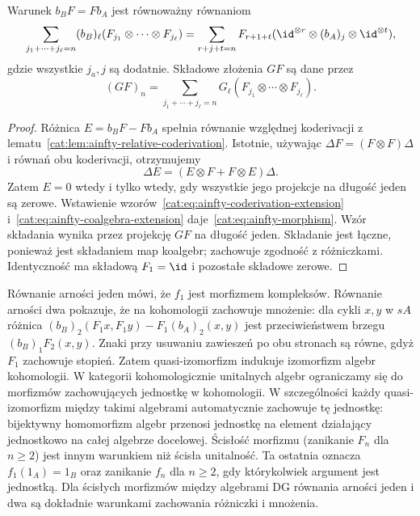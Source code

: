 \begin{stwierdzenie}\label{cat:prop:ainfty-morphism-equations}
Warunek $b_B F=F b_A$ jest równoważny równaniom
\begin{equation}\label{cat:eq:ainfty-morphism}
 \sum_{j_1+\cdots+j_\ell=n}
 (b_B)_\ell(F_{j_1}\otimes\cdots\otimes F_{j_\ell})
 =
 \sum_{r+j+t=n}F_{r+1+t}
 (\id^{\otimes r}\otimes(b_A)_j\otimes\id^{\otimes t}),
\end{equation}
gdzie wszystkie $j_a,j$ są dodatnie. Składowe złożenia $GF$ są dane przez
\[
 (GF)_n=\sum_{j_1+\cdots+j_\ell=n}
 G_\ell(F_{j_1}\otimes\cdots\otimes F_{j_\ell}).
\]
\end{stwierdzenie}
\begin{proof}
Różnica $E=b_B F-Fb_A$ spełnia równanie względnej koderivacji z lematu~\ref{cat:lem:ainfty-relative-coderivation}. Istotnie, używając $\Delta F=(F\otimes F)\Delta$ i równań obu koderivacji, otrzymujemy
\[
 \Delta E=(E\otimes F+F\otimes E)\Delta.
\]
Zatem $E=0$ wtedy i tylko wtedy, gdy wszystkie jego projekcje na długość jeden są zerowe. Wstawienie wzorów~\eqref{cat:eq:ainfty-coderivation-extension} i~\eqref{cat:eq:ainfty-coalgebra-extension} daje~\eqref{cat:eq:ainfty-morphism}. Wzór składania wynika przez projekcję $GF$ na długość jeden. Składanie jest łączne, ponieważ jest składaniem map koalgebr; zachowuje zgodność z różniczkami. Identyczność ma składową $F_1=\id$ i pozostałe składowe zerowe.
\end{proof}

Równanie arności jeden mówi, że $f_1$ jest morfizmem kompleksów. Równanie arności dwa pokazuje, że na kohomologii zachowuje mnożenie: dla cykli $x,y$ w $sA$ różnica $(b_B)_2(F_1x,F_1y)-F_1(b_A)_2(x,y)$ jest przeciwieństwem brzegu $(b_B)_1F_2(x,y)$. Znaki przy usuwaniu zawieszeń po obu stronach są równe, gdyż $F_1$ zachowuje stopień. Zatem quasi-izomorfizm indukuje izomorfizm algebr kohomologii. W kategorii kohomologicznie unitalnych algebr ograniczamy się do morfizmów zachowujących jednostkę w kohomologii. W szczególności każdy quasi-izomorfizm między takimi algebrami automatycznie zachowuje tę jednostkę: bijektywny homomorfizm algebr przenosi jednostkę na element działający jednostkowo na całej algebrze docelowej. Ścisłość morfizmu (zanikanie $F_n$ dla $n\geq2$) jest innym warunkiem niż ścisła unitalność. Ta ostatnia oznacza $f_1(1_A)=1_B$ oraz zanikanie $f_n$ dla $n\geq2$, gdy którykolwiek argument jest jednostką. Dla ścisłych morfizmów między algebrami DG równania arności jeden i dwa są dokładnie warunkami zachowania różniczki i mnożenia.

